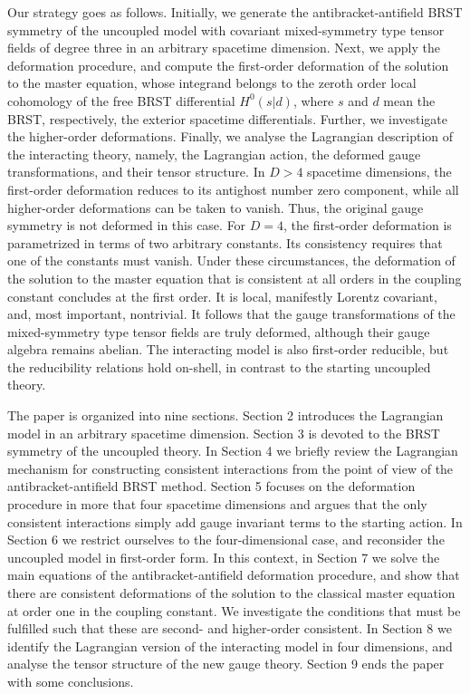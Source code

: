 \documentclass[a4paper,12pt]{article}
\begin{document}
Our strategy goes as follows. Initially, we generate the
antibracket-antifield BRST symmetry of the uncoupled model with covariant
mixed-symmetry type tensor fields of degree three in an arbitrary spacetime
dimension. Next, we apply the deformation procedure, and compute the
first-order deformation of the solution to the master equation, whose
integrand belongs to the zeroth order local cohomology of the free BRST
differential $H^{0}\left( s|d\right) $, where $s$ and $d$ mean the BRST,
respectively, the exterior spacetime differentials. Further, we investigate
the higher-order deformations. Finally, we analyse the Lagrangian
description of the interacting theory, namely, the Lagrangian action, the
deformed gauge transformations, and their tensor structure. In $D>4$
spacetime dimensions, the first-order deformation reduces to its antighost
number zero component, while all higher-order deformations can be taken to
vanish. Thus, the original gauge symmetry is not deformed in this case. For $%
D=4$, the first-order deformation is parametrized in terms of two arbitrary
constants. Its consistency requires that one of the constants must vanish.
Under these circumstances, the deformation of the solution to the master
equation that is consistent at all orders in the coupling constant concludes
at the first order. It is local, manifestly Lorentz covariant, and, most
important, nontrivial. It follows that the gauge transformations of the
mixed-symmetry type tensor fields are truly deformed, although their gauge
algebra remains abelian. The interacting model is also first-order
reducible, but the reducibility relations hold on-shell, in contrast to the
starting uncoupled theory.

The paper is organized into nine sections. Section 2 introduces the
Lagrangian model in an arbitrary spacetime dimension. Section 3 is devoted
to the BRST symmetry of the uncoupled theory. In Section 4 we briefly review
the Lagrangian mechanism for constructing consistent interactions from the
point of view of the antibracket-antifield BRST method. Section 5 focuses on
the deformation procedure in more that four spacetime dimensions and argues
that the only consistent interactions simply add gauge invariant terms to
the starting action. In Section 6 we restrict ourselves to the
four-dimensional case, and reconsider the uncoupled model in first-order
form. In this context, in Section 7 we solve the main equations of the
antibracket-antifield deformation procedure, and show that there are
consistent deformations of the solution to the classical master equation at
order one in the coupling constant. We investigate the conditions that must
be fulfilled such that these are second- and higher-order consistent. In
Section 8 we identify the Lagrangian version of the interacting model in
four dimensions, and analyse the tensor structure of the new gauge theory.
Section 9 ends the paper with some conclusions.
\end{document}
